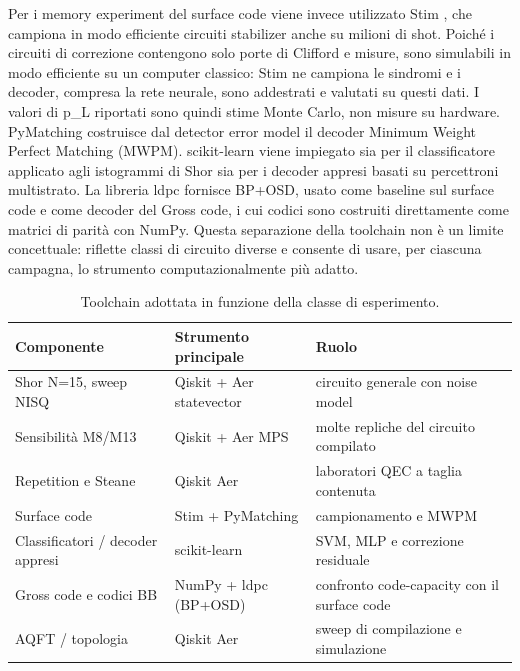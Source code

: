 Per i memory experiment del surface code viene invece utilizzato Stim \cite{stim2021}, che campiona in modo efficiente circuiti stabilizer anche su milioni di shot. Poiché i circuiti di correzione contengono solo porte di Clifford e misure, sono simulabili in modo efficiente su un computer classico: Stim ne campiona le sindromi e i decoder, compresa la rete neurale, sono addestrati e valutati su questi dati. I valori di p\_L riportati sono quindi stime Monte Carlo, non misure su hardware. PyMatching \cite{pymatching2021} costruisce dal detector error model il decoder Minimum Weight Perfect Matching (MWPM). scikit-learn \cite{scikit_learn} viene impiegato sia per il classificatore applicato agli istogrammi di Shor sia per i decoder appresi basati su percettroni multistrato. La libreria ldpc \cite{roffe2020} fornisce BP+OSD, usato come baseline sul surface code e come decoder del Gross code, i cui codici sono costruiti direttamente come matrici di parità con NumPy. Questa separazione della toolchain non è un limite concettuale: riflette classi di circuito diverse e consente di usare, per ciascuna campagna, lo strumento computazionalmente più adatto.

\begingroup
\small
\begin{table}[!htbp]
\centering
\small

\begin{tabular}{@{}
  >{\raggedright\arraybackslash}p{}
  >{\raggedright\arraybackslash}p{}
  >{\raggedright\arraybackslash}p{}@{}}
\toprule
\textbf{Componente} & \textbf{Strumento principale} & \textbf{Ruolo} \\
\midrule
Shor N=15, sweep NISQ & Qiskit + Aer statevector & circuito generale con noise model \\
\addlinespace[0.3em]
Sensibilità M8/M13 & Qiskit + Aer MPS & molte repliche del circuito compilato \\
\addlinespace[0.3em]
Repetition e Steane & Qiskit Aer & laboratori QEC a taglia contenuta \\
\addlinespace[0.3em]
Surface code & Stim + PyMatching & campionamento e MWPM \\
\addlinespace[0.3em]
Classificatori / decoder appresi & scikit-learn & SVM, MLP e correzione residuale \\
\addlinespace[0.3em]
Gross code e codici BB & NumPy + ldpc (BP+OSD) & confronto code-capacity con il surface code \\
\addlinespace[0.3em]
AQFT / topologia & Qiskit Aer & sweep di compilazione e simulazione \\
\bottomrule
\end{tabular}
\caption{Toolchain adottata in funzione della classe di esperimento.}\label{tab:finale_4_1}

\end{table}
\endgroup

